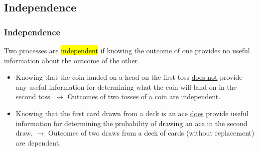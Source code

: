 
\subsection{Independence}


\begin{frame}
\frametitle{Independence}

Two processes are \hl{independent} if knowing the outcome of one provides no useful information about the outcome of the other.

\pause

\begin{itemize}

\item Knowing that the coin landed on a head on the first toss \underline{does not} provide any useful information for determining what the coin will land on in the second toss. $\rightarrow$ Outcomes of two tosses of a coin are independent.

\pause

\item Knowing that the first card drawn from a deck is an ace \underline{does} provide useful information for determining the probability of drawing an ace in the second draw. $\rightarrow$ Outcomes of two draws from a deck of cards (without replacement) are dependent.

\end{itemize}

\end{frame}



\begin{frame}
\frametitle{}


$\:$ \\


\end{frame}

